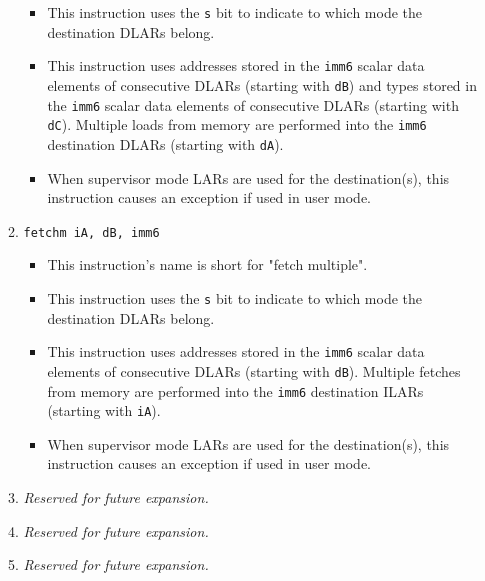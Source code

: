 \documentclass{article}
\begin{document}
\begin{itemize}
\begin{enumerate}
\begin{itemize}
				\item This instruction uses the \texttt{s} bit to indicate
					to which mode the destination DLARs belong.
				\item This instruction uses addresses stored in the
					\texttt{imm6} scalar data elements of consecutive DLARs
					(starting with \texttt{dB}) and types stored in the
					\texttt{imm6} scalar data elements of consecutive DLARs
					(starting with \texttt{dC}). Multiple loads from memory
					are performed into the \texttt{imm6} destination DLARs
					(starting with \texttt{dA}).
				\item When supervisor mode LARs are used for the
					destination(s), this instruction causes an exception if
					used in user mode.
				\end{itemize}

			\item \texttt{fetchm iA, dB, imm6}
				\begin{itemize}
				\item This instruction's name is short for "fetch
					multiple".
				\item This instruction uses the \texttt{s} bit to indicate
					to which mode the destination DLARs belong.
				\item This instruction uses addresses stored in the
					\texttt{imm6} scalar data elements of consecutive DLARs
					(starting with \texttt{dB}). Multiple fetches from
					memory are performed into the \texttt{imm6} destination
					ILARs (starting with \texttt{iA}).
				\item When supervisor mode LARs are used for the
					destination(s), this instruction causes an exception if
					used in user mode.
				\end{itemize}
			\item \textit{Reserved for future expansion.}
			\item \textit{Reserved for future expansion.}
			\item \textit{Reserved for future expansion.}
			\end{enumerate}
		\end{itemize}
		\newpage
\end{document}
